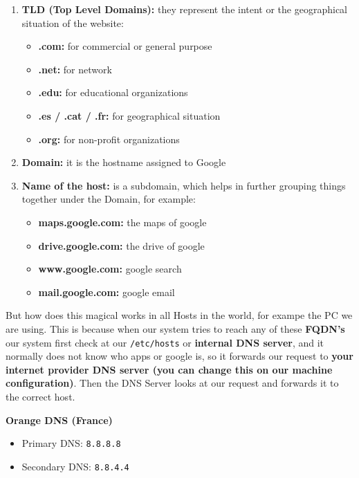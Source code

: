 \documentclass{article}
\begin{document}
\begin{enumerate}
    \item \textbf{TLD (Top Level Domains):} they represent the intent or the geographical situation of the website:
    \begin{itemize}
        \item \textbf{.com:} for commercial or general purpose
        \item \textbf{.net:} for network
        \item \textbf{.edu:} for educational organizations
        \item \textbf{.es / .cat / .fr:} for geographical situation
        \item \textbf{.org:} for non-profit organizations
    \end{itemize}

    \item \textbf{Domain:} it is the hostname assigned to Google
    \item \textbf{Name of the host:} is a subdomain, which helps in further grouping things together under the Domain, for example:
    \begin{itemize}
        \item \textbf{maps.google.com:} the maps of google
        \item \textbf{drive.google.com:} the drive of google
        \item \textbf{www.google.com:} google search
        \item \textbf{mail.google.com:} google email
    \end{itemize}
\end{enumerate}

But how does this magical works in all Hosts in the world, for exampe the PC we are using. This is because when our system tries to reach any of these \textbf{FQDN's} our system first check at our \verb|/etc/hosts| or \textbf{internal DNS server}, and it normally does not know who apps or google is, so it forwards our request to
\textbf{your internet provider DNS server (you can change this on our machine configuration)}. Then the DNS Server looks at our request and forwards it to the correct host.

\textbf{Orange DNS (France)}
\begin{itemize}
    \item Primary DNS: \texttt{8.8.8.8}
    \item Secondary DNS: \texttt{8.8.4.4}
\end{itemize}
\end{document}
